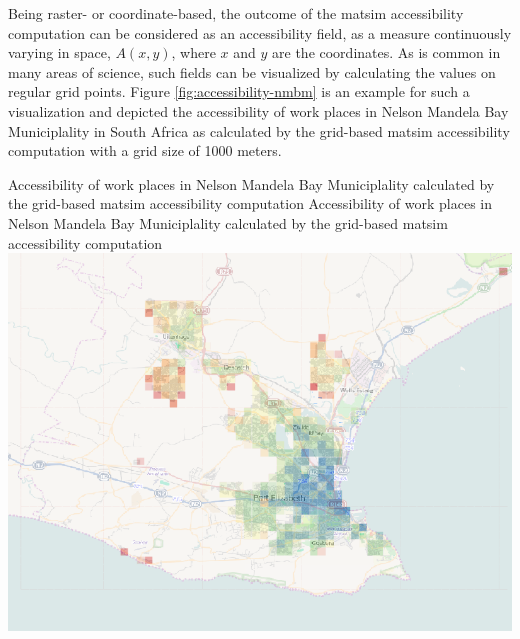 Being raster- or coordinate-based, the outcome of the \gls{matsim} accessibility computation can be
considered as an accessibility field, \ie as a measure continuously varying in space, $A(x,y)$, where 
$x$ and $y$ are the coordinates. As is common in many areas of science, such fields can be visualized 
by calculating the values on regular grid points. Figure \ref{fig:accessibility-nmbm} is an example for 
such a visualization and depicted the accessibility of work places in Nelson Mandela Bay Municiplality 
in South Africa as calculated by the grid-based \gls{matsim} accessibility computation with a grid size 
of 1000 meters.


%

\createfigure%
{Accessibility of work places in Nelson Mandela Bay Municiplality calculated
	by the grid-based \gls{matsim} accessibility computation}%
{Accessibility of work places in Nelson Mandela Bay Municiplality calculated
	by the grid-based \gls{matsim} accessibility computation}%
{\label{fig:accessibility-nmbm}}%
{\includegraphics[width=0.99\hsize]{extending/figures/accessibility/w_freeSpeed_snapshot.png}}%
{}

